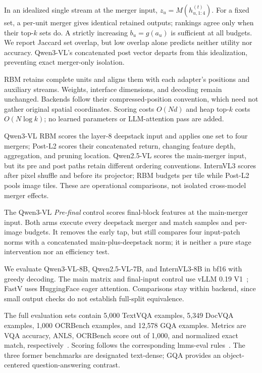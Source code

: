 \documentclass[smallabstract,smallcaptions]{dccpaper}
\begin{document}
In an idealized single stream at the merger input, $z_u=M(h^{(t)}_{u,1:4})$. For a fixed set, a per-unit merger gives identical retained outputs; rankings agree only when their top-$k$ sets do. A strictly increasing $b_u=g(a_u)$ is sufficient at all budgets. We report Jaccard set overlap, but low overlap alone predicts neither utility nor accuracy. Qwen3-VL's concatenated post vector departs from this idealization, preventing exact merger-only isolation.

RBM retains complete units and aligns them with each adapter's positions and auxiliary streams. Weights, interface dimensions, and decoding remain unchanged. Backends follow their compressed-position convention, which need not gather original spatial coordinates. Scoring costs $O(Nd)$ and heap top-$k$ costs $O(N\log k)$; no learned parameters or LLM-attention pass are added.

Qwen3-VL RBM scores the layer-8 deepstack input and applies one set to four mergers; Post-L2 scores their concatenated return, changing feature depth, aggregation, and pruning location. Qwen2.5-VL scores the main-merger input, but its pre and post paths retain different ordering conventions. InternVL3 scores after pixel shuffle and before its projector; RBM budgets per tile while Post-L2 pools image tiles. These are operational comparisons, not isolated cross-model merger effects.

The Qwen3-VL \emph{Pre-final} control scores final-block features at the main-merger input. Both arms execute every deepstack merger and match samples and per-image budgets. It removes the early tap, but still compares four input-patch norms with a concatenated main-plus-deepstack norm; it is neither a pure stage intervention nor an efficiency test.

We evaluate Qwen3-VL-8B, Qwen2.5-VL-7B, and InternVL3-8B in bf16 with greedy decoding. The main matrix and final-input control use vLLM 0.19 V1~\cite{kwon2023vllm}; FastV uses HuggingFace eager attention. Comparisons stay within backend, since small output checks do not establish full-split equivalence.

The full evaluation sets contain 5,000 TextVQA examples, 5,349 DocVQA examples, 1,000 OCRBench examples, and 12,578 GQA examples. Metrics are VQA accuracy, ANLS, OCRBench score out of 1,000, and normalized exact match, respectively~\cite{singh2019textvqa,mathew2021docvqa,liu2024ocrbench,hudson2019gqa}. Scoring follows the corresponding lmms-eval rules~\cite{zhang2024lmmseval}. The three former benchmarks are designated text-dense; GQA provides an object-centered question-answering contrast.
\end{document}
